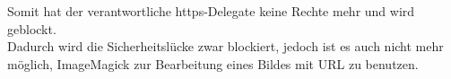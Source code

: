 Somit hat der verantwortliche https-Delegate keine Rechte mehr und wird geblockt.\\
Dadurch wird die Sicherheitslücke zwar blockiert, jedoch ist es auch nicht mehr möglich, ImageMagick zur Bearbeitung eines Bildes mit URL zu benutzen.\\